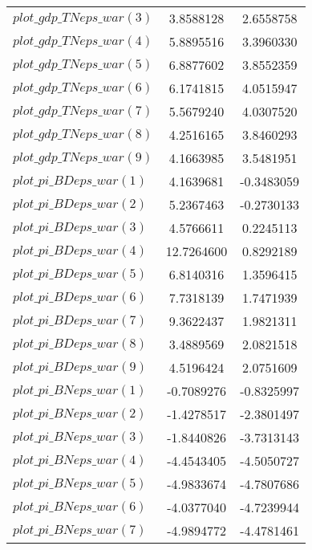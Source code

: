 \begin{center}
\begin{longtable}{lcc}
$plot\_gdp\_TN eps\_war (3)  $	 & 	      3.8588128	 & 	      2.6558758 \\ 
$plot\_gdp\_TN eps\_war (4)  $	 & 	      5.8895516	 & 	      3.3960330 \\ 
$plot\_gdp\_TN eps\_war (5)  $	 & 	      6.8877602	 & 	      3.8552359 \\ 
$plot\_gdp\_TN eps\_war (6)  $	 & 	      6.1741815	 & 	      4.0515947 \\ 
$plot\_gdp\_TN eps\_war (7)  $	 & 	      5.5679240	 & 	      4.0307520 \\ 
$plot\_gdp\_TN eps\_war (8)  $	 & 	      4.2516165	 & 	      3.8460293 \\ 
$plot\_gdp\_TN eps\_war (9)  $	 & 	      4.1663985	 & 	      3.5481951 \\ 
$plot\_pi\_BD eps\_war (1)   $	 & 	      4.1639681	 & 	     -0.3483059 \\ 
$plot\_pi\_BD eps\_war (2)   $	 & 	      5.2367463	 & 	     -0.2730133 \\ 
$plot\_pi\_BD eps\_war (3)   $	 & 	      4.5766611	 & 	      0.2245113 \\ 
$plot\_pi\_BD eps\_war (4)   $	 & 	     12.7264600	 & 	      0.8292189 \\ 
$plot\_pi\_BD eps\_war (5)   $	 & 	      6.8140316	 & 	      1.3596415 \\ 
$plot\_pi\_BD eps\_war (6)   $	 & 	      7.7318139	 & 	      1.7471939 \\ 
$plot\_pi\_BD eps\_war (7)   $	 & 	      9.3622437	 & 	      1.9821311 \\ 
$plot\_pi\_BD eps\_war (8)   $	 & 	      3.4889569	 & 	      2.0821518 \\ 
$plot\_pi\_BD eps\_war (9)   $	 & 	      4.5196424	 & 	      2.0751609 \\ 
$plot\_pi\_BN eps\_war (1)   $	 & 	     -0.7089276	 & 	     -0.8325997 \\ 
$plot\_pi\_BN eps\_war (2)   $	 & 	     -1.4278517	 & 	     -2.3801497 \\ 
$plot\_pi\_BN eps\_war (3)   $	 & 	     -1.8440826	 & 	     -3.7313143 \\ 
$plot\_pi\_BN eps\_war (4)   $	 & 	     -4.4543405	 & 	     -4.5050727 \\ 
$plot\_pi\_BN eps\_war (5)   $	 & 	     -4.9833674	 & 	     -4.7807686 \\ 
$plot\_pi\_BN eps\_war (6)   $	 & 	     -4.0377040	 & 	     -4.7239944 \\ 
$plot\_pi\_BN eps\_war (7)   $	 & 	     -4.9894772	 & 	     -4.4781461 \\ 

\end{longtable}
\end{center}
